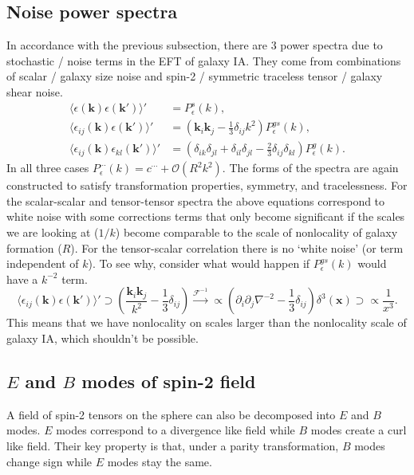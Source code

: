 \documentclass[11pt]{article}
\newcommand{\br}[1]{\ensuremath{\left( #1 \right)}}
\begin{document}
\subsection{Noise power spectra}
\label{sec:noisepowerspectragalaxyIA}
In accordance with the previous subsection, there are 3 power spectra due to stochastic / noise terms in the EFT of galaxy IA. They come from combinations of scalar / galaxy size noise and spin-2 / symmetric traceless tensor / galaxy shear noise.
\begin{align}
    \langle \epsilon(\mathbf k)\epsilon(\mathbf k') \rangle' &= P^s_\epsilon(k), \\
    \langle \epsilon_{ij}(\mathbf k)\epsilon(\mathbf k') \rangle' &= (\mathbf k_i \mathbf k_j - \frac{1}{3} \delta_{ij}k^2)P^{gs}_\epsilon(k), \\
    \langle \epsilon_{ij}(\mathbf k)\epsilon_{kl}(\mathbf k') \rangle' &= (\delta_{ik}\delta_{jl}+\delta_{il}\delta_{jl}-\frac{2}{3}\delta_{ij}\delta_{kl})P^g_\epsilon(k) .
\end{align}
In all three cases $P_{\epsilon}^{\cdots}(k) = c^{\cdots} + \mathcal O(R^2k^2)$. The forms of the spectra are again constructed to satisfy transformation properties, symmetry, and tracelessness. For the scalar-scalar and tensor-tensor spectra the above equations correspond to white noise with some corrections terms that only become significant if the scales we are looking at ($1/k$) become comparable to the scale of nonlocality of galaxy formation ($R$). For the tensor-scalar correlation there is no `white noise' (or term independent of $k$). To see why, consider what would happen if $P^{gs}_\epsilon(k)$ would have a $k^{-2}$ term.
\begin{equation}
    \langle \epsilon_{ij}(\mathbf k)\epsilon(\mathbf k') \rangle' \supset \br{ \frac{\mathbf k_i\mathbf k_j}{k^2} - \frac{1}{3}\delta_{ij}} \xrightarrow{\mathcal F^{-1}}\propto (\partial_i\partial_j\nabla^{-2} - \frac{1}{3}\delta_{ij})\delta^{3}(\mathbf x) \supset \propto \frac{1}{x^3}.
\end{equation}
This means that we have nonlocality on scales larger than the nonlocality scale of galaxy IA, which shouldn't be possible.

\subsection{$E$ and $B$ modes of spin-2 field}
A field of spin-2 tensors on the sphere can also be decomposed into $E$ and $B$ modes. $E$ modes correspond to a divergence like field while $B$ modes create a curl like field. Their key property is that, under a parity transformation, $B$ modes change sign while $E$ modes stay the same.
\end{document}
